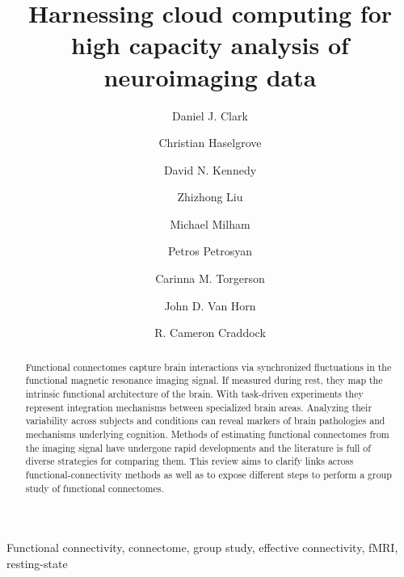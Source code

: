 \documentclass[1p,11pt]{elsarticle}
\begin{document}


\title{Harnessing cloud computing for high capacity analysis of neuroimaging data}


\author[cdb]{Daniel J. Clark}
\author[mass]{Christian Haselgrove}
\author[mass]{David N. Kennedy}
\author[loni]{Zhizhong Liu}
\author[cdb,cbin]{Michael Milham}
\author[loni]{Petros Petrosyan}
\author[loni]{Carinna M. Torgerson}
\author[loni]{John D. Van Horn}
\author[cdb,cnl]{R. Cameron Craddock}


\address[cdb]{Center for the Developing Brain, Child Mind Institute, New York, New York, USA}
\address[mass]{Division of Informatics, Department of Psychiatry,
    University of Massachusetts Medical School, Worcester, MA, USA}
\address[loni]{The Institute for Neuroimaging and Informatics (INI) and
    Laboratory of Neuro Imaging (LONI), Keck School of Medicine of USC,
    University of Southern California, Los Angeles, CA, USA}
\address[cbin]{Center for Biomedical Imaging and Neuromodulation,
    Nathan S. Kline Institute for Psychiatric Research, Orangeburg, New York, USA}
\address[cnl]{Computational Neuroimaging Laboratory,
    Center for Biomedical Imaging and Neuromodulation,
    Nathan S. Kline Institute for Psychiatric Research, Orangeburg, New York, USA}

\begin{abstract}
	Functional connectomes capture brain interactions via synchronized
	fluctuations in the functional magnetic resonance imaging signal. If
	measured during rest, they map the intrinsic functional architecture of
	the brain. With task-driven experiments they represent integration
	mechanisms between specialized brain areas. Analyzing their variability
	across subjects and conditions can reveal
	markers of brain pathologies and mechanisms underlying cognition.
	Methods of estimating functional connectomes from the imaging signal
	have undergone rapid developments and the literature is full of diverse
	strategies for comparing them. This review aims to clarify links across
	functional-connectivity methods as well as to expose different steps 
	to perform a group study of functional connectomes.
\end{abstract}

\begin{keyword}
    Functional connectivity, connectome, group study, effective
    connectivity, fMRI, resting-state
\end{keyword}
\end{document}
